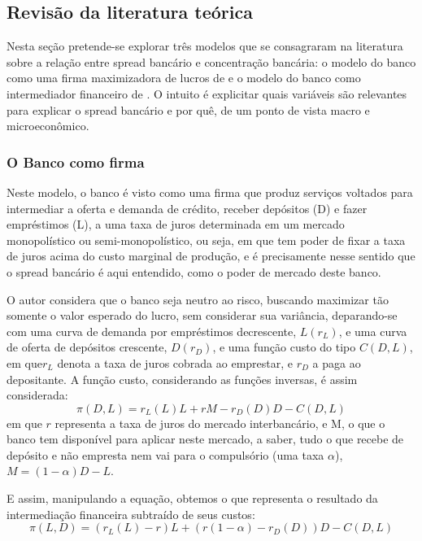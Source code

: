 \documentclass[a4paper, article, 12pt, openany, oneside, english, brazil]{abntex2}
\numberwithin{equation}{section}
\begin{document}
\subsection{Revisão da literatura teórica}

    Nesta seção pretende-se explorar três modelos que se consagraram na literatura sobre a relação entre spread bancário e concentração bancária: o modelo do banco como uma firma maximizadora de lucros de  e o modelo do banco como intermediador financeiro de . O intuito é explicitar quais variáveis são relevantes para explicar o spread bancário e por quê, de um ponto de vista macro e microeconômico.

\subsubsection{O Banco como firma}

    Neste modelo, o banco é visto como uma firma que produz serviços voltados para intermediar a oferta e demanda de crédito, receber depósitos (D) e fazer empréstimos (L), a uma taxa de juros determinada em um mercado monopolístico ou semi-monopolístico, ou seja, em que tem poder de fixar a taxa de juros acima do custo marginal de produção, e é precisamente nesse sentido que o spread bancário é aqui entendido, como o poder de mercado deste banco. \cite{oreiro}

    O autor considera que o banco seja neutro ao risco, buscando maximizar tão somente o valor esperado do lucro, sem considerar sua variância, deparando-se com uma curva de demanda por empréstimos decrescente, $L(r_L)$, e uma curva de oferta de depósitos crescente, $D(r_D)$, e uma função custo do tipo $C(D, L)$, em que$ r_L$ denota a taxa de juros cobrada ao emprestar, e $r_D$ a paga ao depositante. A função custo, considerando as funções inversas, é assim considerada: \begin{equation}\pi(D, L) = r_L(L)L + rM - r_D(D)D - C(D, L)\end{equation} em que $r$ representa a taxa de juros do mercado interbancário, e M, o que o banco tem disponível para aplicar neste mercado, a saber, tudo o que recebe de depósito e não empresta nem vai para o compulsório (uma taxa $\alpha$), $M = (1 - \alpha)D - L$.

    E assim, manipulando a equação, obtemos o que representa o resultado da intermediação financeira subtraído de seus custos: \begin{equation}\pi(L, D) = (r_L(L) - r)L + (r(1 - \alpha) - r_D(D))D - C(D, L)\end{equation}
\end{document}
